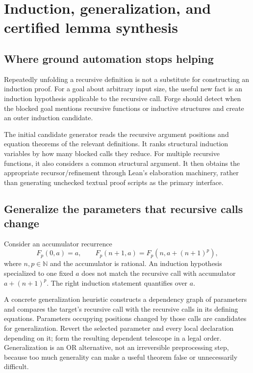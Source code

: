 \documentclass[11pt,letterpaper]{article}
\newcommand{\N}{\mathbb{N}}
\theoremstyle{definition}\newtheorem{definition}[proposition]{Definition}
\begin{document}
\section{Induction, generalization, and certified lemma synthesis}
\label{sec:induction}
\subsection{Where ground automation stops helping}
Repeatedly unfolding a recursive definition is not a substitute for constructing an induction proof. For a goal about arbitrary input size, the useful new fact is an induction hypothesis applicable to the recursive call. Forge should detect when the blocked goal mentions recursive functions or inductive structures and create an outer induction candidate.

The initial candidate generator reads the recursive argument positions and equation theorems of the relevant definitions. It ranks structural induction variables by how many blocked calls they reduce. For multiple recursive functions, it also considers a common structural argument. It then obtains the appropriate recursor/refinement through Lean's elaboration machinery, rather than generating unchecked textual proof scripts as the primary interface.

\subsection{Generalize the parameters that recursive calls change}
Consider an accumulator recurrence
\begin{equation}
\label{eq:recurrence}
F_p(0,a)=a,\qquad
F_p(n+1,a)=F_p(n,a+(n+1)^p),
\end{equation}
where $n,p\in\N$ and the accumulator is rational. An induction hypothesis specialized to one fixed $a$ does not match the recursive call with accumulator $a+(n+1)^p$. The right induction statement quantifies over $a$.

A concrete generalization heuristic constructs a dependency graph of parameters and compares the target's recursive call with the recursive calls in its defining equations. Parameters occupying positions changed by those calls are candidates for generalization. Revert the selected parameter and every local declaration depending on it; form the resulting dependent telescope in a legal order. Generalization is an OR alternative, not an irreversible preprocessing step, because too much generality can make a useful theorem false or unnecessarily difficult.
\end{document}
